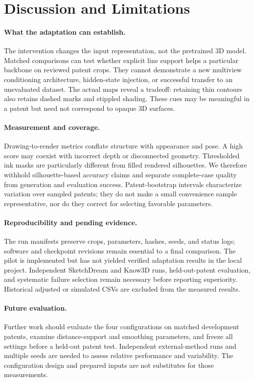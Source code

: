 \section{Discussion and Limitations}
\label{sec:discussion}

\paragraph{What the adaptation can establish.}
The intervention changes the input representation, not the pretrained 3D model.
Matched comparisons can test whether explicit line support helps a particular
backbone on reviewed patent crops. They cannot demonstrate a new multiview
conditioning architecture, hidden-state injection, or successful transfer to an
unevaluated dataset. The actual maps reveal a tradeoff: retaining thin contours
also retains dashed marks and stippled shading. These cues may be meaningful in
a patent but need not correspond to opaque 3D surfaces.

\paragraph{Measurement and coverage.}
Drawing-to-render metrics conflate structure with appearance and pose.
A high score may coexist with incorrect depth or disconnected geometry.
Thresholded ink masks are particularly different from filled rendered silhouettes.
We therefore withhold silhouette-based accuracy claims and separate complete-case
quality from generation and evaluation success. Patent-bootstrap intervals
characterize variation over sampled patents; they do not make a small convenience
sample representative, nor do they correct for selecting favorable parameters.

\paragraph{Reproducibility and pending evidence.}
The run manifests preserve crops, parameters, hashes, seeds, and status logs;
software and checkpoint revisions remain essential to a final comparison.
The pilot is implemented but has not yielded verified adaptation results in the
local project. Independent SketchDream and Know3D runs, held-out-patent evaluation,
and systematic failure selection remain necessary before reporting superiority.
Historical adjusted or simulated CSVs are excluded from the measured results.

\paragraph{Future evaluation.}
Further work should evaluate the four configurations on matched development
patents, examine distance-support and smoothing parameters, and freeze all
settings before a held-out patent test. Independent external-method runs and
multiple seeds are needed to assess relative performance and variability.
The configuration design and prepared inputs are not substitutes for those
measurements.

